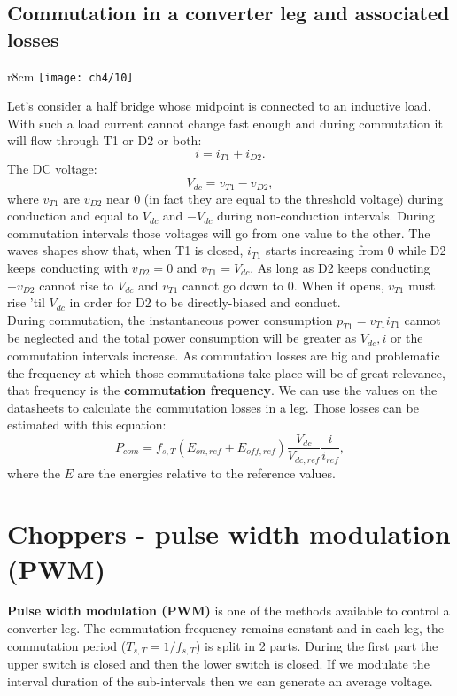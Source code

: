 	\subsection{Commutation in a converter leg and associated losses}
		\begin{wrapfigure}[8]{r}{8cm}
		\vspace{-5mm}
		\texttt{[image: ch4/10]}
		\end{wrapfigure}
		Let's consider a half bridge whose midpoint is connected to an inductive load. With such a load current cannot change fast enough and during commutation it will flow through T1 or D2 or both: 
		\begin{equation}
			i = i_{T1}+ i_{D2}.
		\end{equation}		 
		The DC voltage:
		\begin{equation}
			V_{dc} = v_{T1} - v_{D2},
		\end{equation}
		where $v_{T1}$ are $v_{D2}$ near $0$ (in fact they are equal to the threshold voltage) during conduction and equal to $V_{dc}$ and $-V_{dc}$ during non-conduction intervals. During commutation intervals those voltages will go from one value to the other. The waves shapes show that, when T1 is closed, $i_{T1}$ starts increasing from 0 while D2 keeps conducting with $v_{D2} = 0$ and $v_{T1} = V_{dc}$. As long as D2 keeps conducting $-v_{D2}$ cannot rise to $V_{dc}$ and $v_{T1}$ cannot go down to 0. When it opens, $v_{T1}$ must rise 'til $V_{dc}$ in order for D2 to be directly-biased and conduct. \\
		
		During commutation, the instantaneous power consumption $p_{T1} = v_{T1}i_{T1}$ cannot be neglected and the total power consumption will be greater as $V_{dc}, i$ or the commutation intervals increase. As commutation losses are big and problematic the frequency at which those commutations take place will be of great relevance, that frequency is the \textbf{commutation frequency}. We can use the values on the datasheets to calculate the commutation losses in a leg. Those losses can be estimated with this equation:
		\begin{equation}
			P_{com} = f_{s,T} (E_{on,ref}+ E_{off,ref})\frac{V_{dc}}{V_{dc,ref}}\frac{i}{i_{ref}},
		\end{equation}
		where the $E$ are the energies relative to the reference values.
	
\section{Choppers - pulse width modulation (PWM)}
	 \textbf{Pulse width modulation (PWM)} is one of the methods available to control a converter leg. The commutation frequency remains constant and in each leg, the commutation period ($T_{s,T} = 1/f_{s,T}$) is split in 2 parts. During the first part the upper switch is closed and then the lower switch is closed. If we modulate the interval duration of the sub-intervals then we can generate an average voltage. \\
	 
